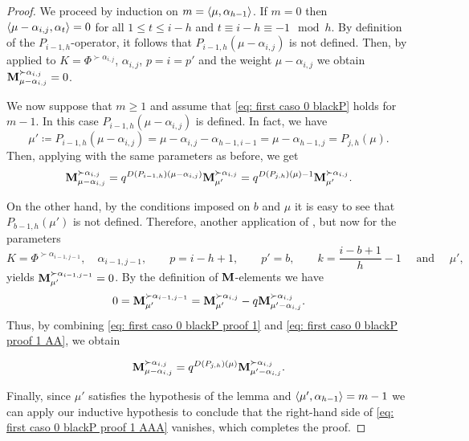 \begin{proof}
We proceed by induction on $m = \langle \mu , \alpha_{h-1} \rangle$.
If $m=0$ then $\langle \mu-\alpha_{i,j} , \alpha_t \rangle=0$ for all $1\leq t \leq i-h$ and $t\equiv i-h \equiv -1 \mod h$. 
By definition of the $P_{i-1,h}$-operator, it follows that  $P_{i-1,h}(\mu-\alpha_{i,j})$ is not defined.
Then,  by  applied to $K =\Phi^{\succ \alpha_{i,j}}$, $\alpha_{i,j}$, $p = i = p'$ and the weight $\mu- \alpha_{i,j}$ we obtain $\mathbf{M}_{\mu-\alpha_{i,j}}^{\succ \alpha_{i,j}} = 0$.

We now suppose that $m\geq 1$ and assume that \eqref{eq: first caso 0 blackP} holds for $m-1$.
In this case $P_{i-1,h}(\mu-\alpha_{i,j})$ is defined.
In fact, we have
\begin{equation}
    \mu'\coloneqq P_{i-1,h}(\mu-\alpha_{i,j}) = \mu-\alpha_{i,j} -\alpha_{h-1,i-1}=\mu-\alpha_{h-1,j}= P_{j,h}(\mu) .
\end{equation}
Then, applying  with the same parameters as before, we get 
\begin{equation}\label{eq: first caso 0 blackP proof 1}
    \mathbf{M}_{\mu-\alpha_{i,j}}^{\succ \alpha_{i,j}} = q^{D(P_{i-1,h})(\mu  - \alpha_{i,j})}\mathbf{M}_{\mu'}^{\succ\alpha_{i,j}}=  q^{D(P_{j,h})(\mu  )-1}\mathbf{M}_{\mu'}^{\succ\alpha_{i,j}}.
\end{equation}

On the other hand, by the conditions imposed on $b$ and $\mu$ it is easy to see that $P_{b-1,h}(\mu')$ is not defined.
 Therefore, another application of  , but now for the parameters
\begin{equation}
\displaystyle    K =\Phi^{\succ\alpha_{i-1,j-1}}, \quad \alpha_{i-1,j-1}, \qquad p = i-h+1, \qquad p'= b, \qquad k = \frac{i-b+1}{h}-1 \quad \mbox{ and } \quad \mu',
\end{equation}
 yields $\mathbf{M}_{\mu'}^{\succ \alpha_{i-1,j-1}} =0$.
 By the definition of $\mathbf{M}$-elements  we have
 \begin{equation} \label{eq: first caso 0 blackP proof 1 AA}
     0 = \mathbf{M}_{\mu'}^{\succ \alpha_{i-1,j-1}}  = \mathbf{M}_{\mu'}^{\succ \alpha_{i,j}} -q \mathbf{M}_{\mu' -\alpha_{i,j}}^{\succ \alpha_{i,j}}.
 \end{equation}
Thus, by combining \eqref{eq: first caso 0 blackP proof 1} and \eqref{eq: first caso 0 blackP proof 1 AA}, we obtain


\begin{equation}\label{eq: first caso 0 blackP proof 1 AAA}
    \mathbf{M}_{\mu-\alpha_{i,j}}^{\succ \alpha_{i,j}} = q^{D(P_{j,h})(\mu)}\mathbf{M}_{\mu' -\alpha_{i,j}}^{\succ\alpha_{i,j}}.
\end{equation}

Finally, since $\mu'$ satisfies the hypothesis of the lemma and $\langle \mu' , \alpha_{h-1} \rangle =m-1$ we can apply our inductive hypothesis to conclude that the right-hand side of \cref{eq: first caso 0 blackP proof 1 AAA} vanishes, which completes the proof. 
\end{proof}








